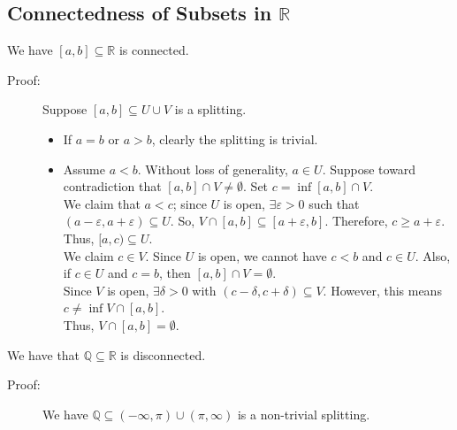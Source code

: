 \documentclass[10pt]{extarticle}
\newcommand{\Q}{\mathbb{Q}}
\newcommand{\R}{\mathbb{R}}
\begin{document}
  \subsection{Connectedness of Subsets in $\R$}%
  We have $[a,b]\subseteq \R$ is connected.
  \begin{description}
    \item[Proof:] Suppose $[a,b]\subseteq U\cup V$ is a splitting.
      \begin{itemize}
        \item If $a=b$ or $a>b$, clearly the splitting is trivial.
        \item Assume $a< b$. Without loss of generality, $a\in U$. Suppose toward contradiction that $[a,b]\cap V \neq \emptyset$. Set $c = \inf [a,b]\cap V$.\\

          We claim that $a<c$; since $U$ is open, $\exists \varepsilon > 0$ such that $(a-\varepsilon,a+\varepsilon) \subseteq U$. So, $V\cap [a,b]\subseteq [a+\varepsilon,b]$. Therefore, $c \geq a+\varepsilon$. Thus, $[a,c)\subseteq U$.\\

          We claim $c\in V$. Since $U$ is open, we cannot have $c<b$ and $c\in U$. Also, if $c\in U$ and $c = b$, then $[a,b]\cap V = \emptyset$.\\

          Since $V$ is open, $\exists \delta > 0$ with $(c-\delta,c+\delta)\subseteq V$. However, this means $c\neq \inf V\cap [a,b]$.\\

          Thus, $V\cap [a,b] = \emptyset$.
      \end{itemize}
  \end{description}
  We have that $\Q\subseteq \R$ is disconnected.
  \begin{description}
    \item[Proof:] We have $\Q\subseteq (-\infty,\pi)\cup(\pi,\infty)$ is a non-trivial splitting.
  \end{description}
\end{document}

